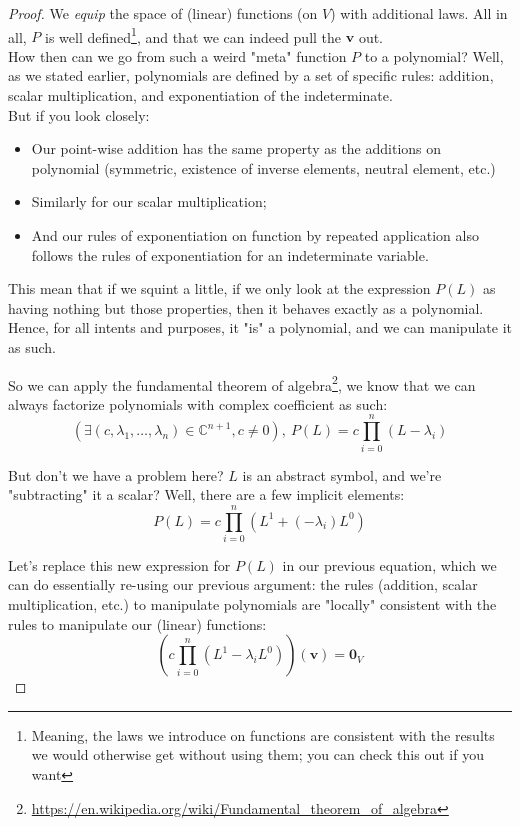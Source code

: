 \documentclass[solutions.tex]{subfiles}
\renewcommand{\bm}[1]{\pmb{#1}}
\begin{document}
\begin{proof}
We \textit{equip} the space of (linear) functions (on $V$) with
additional laws. All in all, $P$ is well defined\footnote{Meaning,
the laws we introduce on functions are consistent with the results
we would otherwise get without using them; you can check this out
if you want}, and that we can indeed pull the $\bm{v}$ out. \\

How then can we go from such a weird "meta" function $P$ to a
polynomial? Well, as we stated earlier, polynomials are defined
by a set of specific rules: addition, scalar multiplication,
and exponentiation of the indeterminate. \\

But if you look closely:
\begin{itemize}
	\item Our point-wise addition has the same property as
	the additions on polynomial (symmetric, existence of inverse
	elements, neutral element, etc.)
	\item Similarly for our scalar multiplication;
	\item And our rules of exponentiation on function by repeated
	application also follows the rules of exponentiation for
	an indeterminate variable.
\end{itemize}

This mean that if we squint a little, if we only look at the
expression $P(L)$ as having nothing but those properties, then
it behaves exactly as a polynomial. Hence, for all intents and
purposes, it "is" a polynomial, and we can manipulate it as such.

So we can apply the fundamental theorem of algebra\footnote{
\url{https://en.wikipedia.org/wiki/Fundamental\_theorem\_of\_algebra}},
we know that we can always factorize polynomials with
complex coefficient as such:
\[
	(\exists (c, \lambda_1, \ldots, \lambda_n)\in\mathbb{C}^{n+1}, c\neq 0),\
		P(L) = c\prod_{i=0}^n (L-\lambda_i)
\]

But don't we have a problem here? $L$ is an abstract symbol, and we're
"subtracting" it a scalar? Well, there are a few implicit elements:
\[
	P(L) = c\prod_{i=0}^n (L^1 + (-\lambda_i)L^0)
\]

Let's replace this new expression for $P(L)$ in our previous equation,
which we can do essentially re-using our previous argument: the
rules (addition, scalar multiplication, etc.) to manipulate polynomials
are "locally" consistent with the rules to manipulate our (linear) functions:
\[
	\left(c\prod_{i=0}^n (L^1-\lambda_i L^0)\right)(\bm{v}) = \bm{0}_V
\]


\end{proof}
\end{document}
